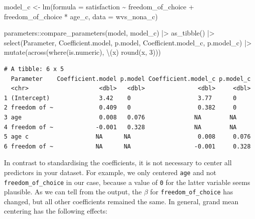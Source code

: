 \documentclass[
  letterpaper,
  DIV=11,
  numbers=noendperiod]{scrreprt}
\newenvironment{Shaded}{\begin{snugshade}}{\end{snugshade}}
\newcommand{\AttributeTok}[1]{\textcolor[rgb]{0.40,0.45,0.13}{#1}}
\newcommand{\DecValTok}[1]{\textcolor[rgb]{0.68,0.00,0.00}{#1}}
\newcommand{\FunctionTok}[1]{\textcolor[rgb]{0.28,0.35,0.67}{#1}}
\newcommand{\NormalTok}[1]{\textcolor[rgb]{0.00,0.23,0.31}{#1}}
\newcommand{\OtherTok}[1]{\textcolor[rgb]{0.00,0.23,0.31}{#1}}
\newcommand{\SpecialCharTok}[1]{\textcolor[rgb]{0.37,0.37,0.37}{#1}}
\begin{document}
\begin{Shaded}
\begin{Highlighting}[]
\NormalTok{model\_c }\OtherTok{\textless{}{-}} \FunctionTok{lm}\NormalTok{(}\AttributeTok{formula =}\NormalTok{ satisfaction }\SpecialCharTok{\textasciitilde{}}
\NormalTok{                freedom\_of\_choice }\SpecialCharTok{+}
\NormalTok{                freedom\_of\_choice }\SpecialCharTok{*}\NormalTok{ age\_c,}
              \AttributeTok{data =}\NormalTok{ wvs\_nona\_c)}

\NormalTok{parameters}\SpecialCharTok{::}\FunctionTok{compare\_parameters}\NormalTok{(model, model\_c) }\SpecialCharTok{|\textgreater{}}
  \FunctionTok{as\_tibble}\NormalTok{() }\SpecialCharTok{|\textgreater{}}
  \FunctionTok{select}\NormalTok{(Parameter, Coefficient.model, p.model,}
\NormalTok{         Coefficient.model\_c, p.model\_c) }\SpecialCharTok{|\textgreater{}}
  \FunctionTok{mutate}\NormalTok{(}\FunctionTok{across}\NormalTok{(}\FunctionTok{where}\NormalTok{(is.numeric), \textbackslash{}(x) }\FunctionTok{round}\NormalTok{(x, }\DecValTok{3}\NormalTok{)))}
\end{Highlighting}
\end{Shaded}

\begin{verbatim}
# A tibble: 6 x 5
  Parameter    Coefficient.model p.model Coefficient.model_c p.model_c
  <chr>                    <dbl>   <dbl>               <dbl>     <dbl>
1 (Intercept)              3.42    0                   3.77      0    
2 freedom of ~             0.409   0                   0.382     0    
3 age                      0.008   0.076              NA        NA    
4 freedom of ~            -0.001   0.328              NA        NA    
5 age c                   NA      NA                   0.008     0.076
6 freedom of ~            NA      NA                  -0.001     0.328
\end{verbatim}

In contrast to standardising the coefficients, it is not necessary to
center all predictors in your dataset. For example, we only centered
\texttt{age} and not \texttt{freedom\_of\_choice} in our case, because a
value of \texttt{0} for the latter variable seems plausible. As we can
tell from the output, the \(\beta\) for \texttt{freedom\_of\_choice} has
changed, but all other coefficients remained the same. In general, grand
mean centering has the following effects:
\end{document}
